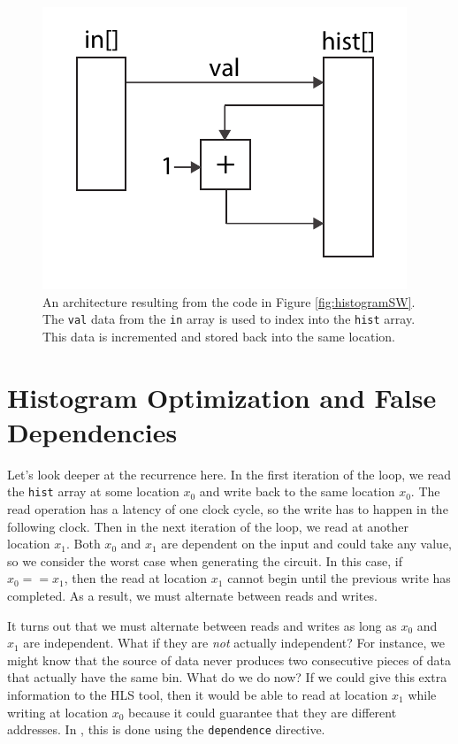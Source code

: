 \begin{figure}
\centering
\includegraphics[width=  .5\textwidth]{images/architectures_histogram}
\caption{ An architecture resulting from the code in Figure \ref{fig:histogramSW}. The \lstinline{val} data from the \lstinline{in} array is used to index into the \lstinline{hist} array. This data is incremented and stored back into the same location.}
\label{fig:architecture_histogram}
\end{figure}

\section{Histogram Optimization and False Dependencies}
Let's look deeper at the recurrence here.  In the first iteration of the loop, we read the \lstinline{hist} array at some location $x_0$ and write back to the same location $x_0$.  The read operation has a latency of one clock cycle, so the write has to happen in the following clock.  Then in the next iteration of the loop, we read at another location $x_1$.  Both $x_0$ and $x_1$ are dependent on the input and could take any value, so we consider the worst case when generating the circuit.  In this case, if $x_0 == x_1$, then the read at location $x_1$ cannot begin until the previous write has completed.  As a result, we must alternate between reads and writes.  

It turns out that we must alternate between reads and writes as long as $x_0$ and $x_1$ are independent.  What if they are {\em not} actually independent?  For instance, we might know that the source of data never produces two consecutive pieces of data that actually have the same bin.  What do we do now?  If we could give this extra information to the HLS tool, then it would be able to read at location $x_1$ while writing at location $x_0$ because it could guarantee that they are different addresses.   In \VHLS, this is done using the \lstinline|dependence| directive.

